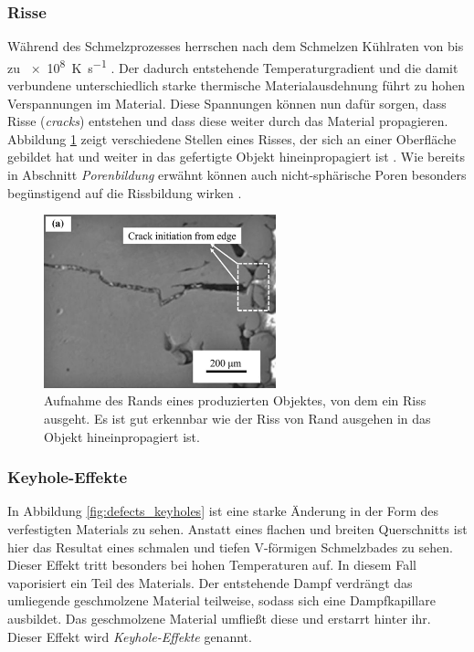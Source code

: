 		\subsubsection{Risse}
		Während des Schmelzprozesses herrschen nach dem Schmelzen Kühlraten von bis zu
		\SI{e8}{\kelvin\per\second} \cite{zhang2017defect}. Der dadurch entstehende
		Temperaturgradient und die damit verbundene unterschiedlich starke thermische
		Materialausdehnung führt zu hohen Verspannungen im Material. Diese Spannungen können nun
		dafür sorgen, dass Risse (\emph{cracks}) entstehen und dass diese weiter durch das
		Material propagieren. Abbildung \ref{fig:defects_cracks} zeigt verschiedene Stellen eines
		Risses, der sich an einer Oberfläche gebildet hat und weiter in das gefertigte Objekt
		hineinpropagiert ist \cite{zhang2017defect}. Wie bereits in Abschnitt \emph{Porenbildung}
		erwähnt können auch nicht-sphärische Poren besonders begünstigend auf die Rissbildung wirken
		\cite{galy2018main}.

		\begin{figure}[!ht]
			\centering
			\includegraphics[width=0.6\textwidth]{chapter/main/theory/img/defects/cracks_part.png}
			\caption{Aufnahme des Rands eines produzierten Objektes, von dem ein Riss ausgeht. Es
			ist gut erkennbar wie der Riss von Rand ausgehen in das Objekt hineinpropagiert ist.
			\cite{zhang2017defect}}
			\label{fig:defects_cracks}
		\end{figure}

		\subsubsection{Keyhole-Effekte}
		In Abbildung \ref{fig:defects_keyholes} ist eine starke Änderung in der Form des
		verfestigten Materials zu sehen. Anstatt eines flachen und breiten Querschnitts ist hier
		das Resultat eines schmalen und tiefen V-förmigen Schmelzbades zu sehen. Dieser Effekt
		tritt besonders bei hohen Temperaturen auf. In diesem Fall vaporisiert ein Teil des
		Materials. Der entstehende Dampf verdrängt das umliegende geschmolzene Material teilweise,
		sodass sich eine Dampfkapillare ausbildet. Das geschmolzene Material umfließt diese und
		erstarrt hinter ihr. Dieser Effekt wird \emph{Keyhole-Effekte} genannt.

